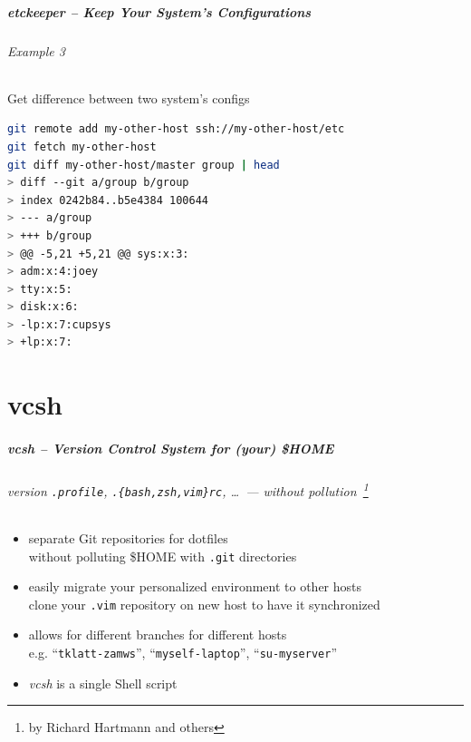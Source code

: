 \documentclass[english,hyperref={pdfpagelabels=false},aspectratio=1610]{beamer}
\begin{document}
\begin{frame}[fragile]
  \frametitle{etckeeper -- Keep Your System's Configurations}
  \framesubtitle{Example 3}
  \begin{block}{Get difference between two system's configs}
    \vspace{-0.75em}
    \begin{lstlisting}[language=zsh]
git remote add my-other-host ssh://my-other-host/etc
git fetch my-other-host
git diff my-other-host/master group | head
> diff --git a/group b/group
> index 0242b84..b5e4384 100644
> --- a/group
> +++ b/group
> @@ -5,21 +5,21 @@ sys:x:3:
> adm:x:4:joey
> tty:x:5:
> disk:x:6:
> -lp:x:7:cupsys
> +lp:x:7:
    \end{lstlisting}
    \vspace{-0.75em}
  \end{block}
\end{frame}


\part{vcsh}
\makepart

\begin{frame}[label=vcsh]
  \frametitle{vcsh -- Version Control System for (your) \$HOME}
  \framesubtitle{version \texttt{.profile}, \texttt{.\{bash,zsh,vim\}rc}, \dots~--- without pollution~\footnote{\tiny by Richard Hartmann and others}}
  \begin{itemize}
    \item separate Git repositories for dotfiles\\
      {\scriptsize without polluting \$HOME with \texttt{.git} directories}
    \item easily migrate your personalized environment to other hosts\\
      {\scriptsize clone your \texttt{.vim} repository on new host to have it synchronized}
    \item allows for different branches for different hosts\\
      {\scriptsize e.g. ``\texttt{tklatt-zamws}'', ``\texttt{myself-laptop}'', ``\texttt{su-myserver}''}
    \item \textit{vcsh} is a single Shell script
  \end{itemize}
\end{frame}
\end{document}
